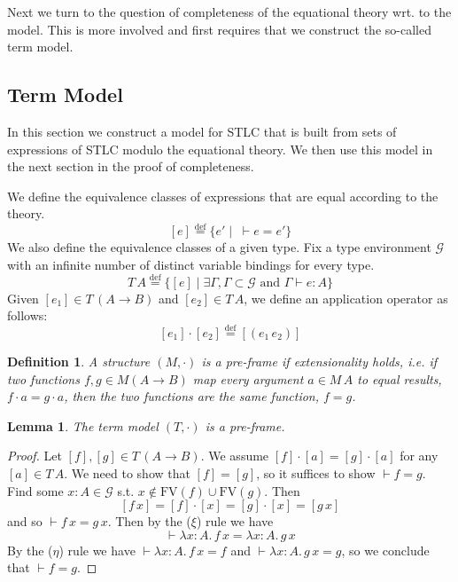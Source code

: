 \documentclass{tufte-handout}
\newcommand{\defeq}[0]{\overset{\mathrm{def}}{=}}
\newcommand{\LAM}[1]{\lambda #1.\,}
\newcommand{\APP}[0]{\,}
\newcommand{\of}[0]{\!:\!}
\newtheorem{lemma}[theorem]{Lemma}
\newtheorem{definition}{Definition}%
\begin{document}
Next we turn to the question of completeness of the equational theory
wrt. to the model. This is more involved and first requires that we
construct the so-called term model.

\subsection{Term Model}

In this section we construct a model for STLC that is built from sets
of expressions of STLC modulo the equational theory. We then use this
model in the next section in the proof of completeness.

We define the equivalence classes of expressions that are equal
according to the theory.
\[
  [e] \defeq \{ e' \mid \; \vdash e = e' \}
\]
We also define the equivalence classes of a given type.  Fix a type
environment $\mathcal{G}$ with an infinite number of distinct variable
bindings for every type.
\[
T\,A \defeq \{ [e] \mid \exists \Gamma, \Gamma \subset \mathcal{G}
  \text{ and } \Gamma \vdash e : A \}
\]
Given $[e_1] \in T\,(A\to B)$ and $[e_2] \in T\,A$, we define an
application operator as follows:
\[
    [e_1] \cdot [e_2] \defeq [(e_1\APP e_2)]
\]

\begin{definition}
A structure $(M,\cdot)$ is a \emph{pre-frame} if extensionality
holds, i.e. if two functions $f,g \in M (A \to B)$ map every argument
$a \in M\,A$ to equal results, $f \cdot a = g \cdot a$, then the two
functions are the same function, $f = g$.
\end{definition}

\begin{lemma}
  The term model $(T,\cdot)$ is a pre-frame.
\end{lemma}
\begin{proof}
Let $[f],[g] \in T\,(A\to B)$.  We assume $[f] \cdot [a] = [g] \cdot
[a]$ for any $[a]\in T\,A$.  We need to show that $[f] = [g]$, so it
suffices to show $\vdash f = g$.  Find some $x : A \in \mathcal{G}$
s.t. $x \notin \mathrm{FV}(f) \cup \mathrm{FV}(g)$.  Then
\[
  [f \APP x] = [f] \cdot [x] = [g] \cdot [x] = [g \APP x]
\]
and so $\vdash f \APP x = g \APP x$. Then by the ($\xi$) rule we have
\[
\vdash \LAM{x\of A} f \APP x = \LAM{x\of A} g \APP x
\]
By the ($\eta$) rule we have $\vdash \LAM{x\of A} f \APP x = f$ and
$\vdash \LAM{x\of A} g \APP x = g$, so we conclude that $\vdash f = g$.
\end{proof}
\end{document}
